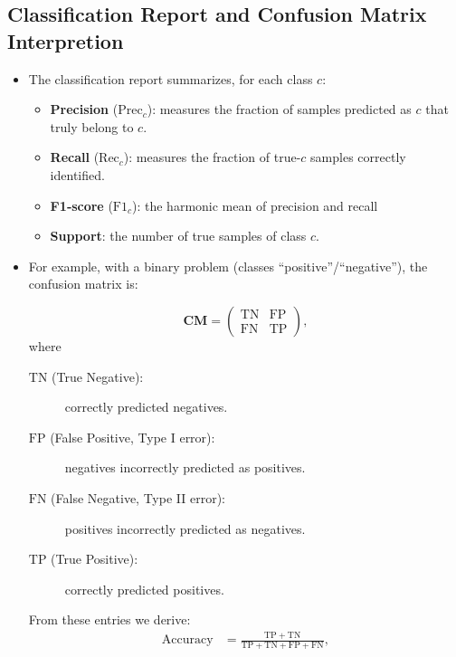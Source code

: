 \subsection{Classification Report and Confusion Matrix Interpretion}
\begin{flushleft}
	\begin{itemize}
		\item The classification report summarizes, for each class \(c\):
		      \begin{itemize}
			      \item \textbf{Precision} (\(\mathrm{Prec}_c\)): measures the fraction of samples predicted as \(c\) that truly belong to \(c\).
			      \item \textbf{Recall} (\(\mathrm{Rec}_c\)): measures the fraction of true-\(c\) samples correctly identified.
			      \item \textbf{F1‑score} (\(\mathrm{F1}_c\)): the harmonic mean of precision and recall
			      \item \textbf{Support}: the number of true samples of class \(c\).
		      \end{itemize}
		\item For example, with a binary problem (classes “positive”/“negative”), the confusion matrix is:
		      \begin{flushleft}
			      \[
				      \mathbf{CM} =
				      \begin{pmatrix}
					      \mathrm{TN} & \mathrm{FP} \\
					      \mathrm{FN} & \mathrm{TP}
				      \end{pmatrix},
			      \]
			      where
			      \begin{description}
				      \item[\(\mathrm{TN}\) (True Negative):] correctly predicted negatives.
				      \item[\(\mathrm{FP}\) (False Positive, Type I error):] negatives incorrectly predicted as positives.
				      \item[\(\mathrm{FN}\) (False Negative, Type II error):] positives incorrectly predicted as negatives.
				      \item[\(\mathrm{TP}\) (True Positive):] correctly predicted positives.
			      \end{description}
			      \noindent From these entries we derive:
			      \begin{align*}
				      \text{Accuracy}                  & = \frac{\mathrm{TP} + \mathrm{TN}}{\mathrm{TP} + \mathrm{TN} + \mathrm{FP} + \mathrm{FN}}, \\

\end{align*}
\end{flushleft}
\end{itemize}
\end{flushleft}
